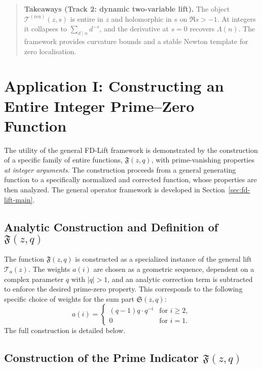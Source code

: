 \documentclass[11pt,a4paper]{amsart}
\theoremstyle{plain}
\theoremstyle{definition}
\theoremstyle{remark}
\begin{document}
\begin{quote}\small
\textbf{Takeaways (Track 2: dynamic two-variable lift).}
The object $\mathcal T^{(\mathrm{ren})}(z,s)$ is entire in $z$ and holomorphic in $s$ on $\Re s>-1$.
At integers it collapses to $\sum_{d\mid n}d^{-s}$, and the derivative at $s=0$ recovers $\Lambda(n)$.
The framework provides curvature bounds and a stable Newton template for zero localisation.
\end{quote}

\section{Application I: Constructing an Entire Integer Prime--Zero Function}
\label{sec:application-prime-indicator}

The utility of the general FD-Lift framework is demonstrated by the construction of a specific family of entire functions, $\mathfrak{F}(z,q)$, with prime-vanishing properties \emph{at integer arguments}. The construction proceeds from a general generating function to a specifically normalized and corrected function, whose properties are then analyzed.
The general operator framework is developed in Section~\ref{sec:fd-lift-main}.

\subsection{Analytic Construction and Definition of $\mathfrak{F}(z,q)$}

The function $\mathfrak{F}(z,q)$ is constructed as a specialized instance of the general lift $\mathcal{T}_a(z)$. The weights $a(i)$ are chosen as a geometric sequence, dependent on a complex parameter $q$ with $|q|>1$, and an analytic correction term is subtracted to enforce the desired prime-zero property. This corresponds to the following specific choice of weights for the sum part $\mathfrak{S}(z,q)$:
\[
a(i) = 
\begin{cases} 
(q-1)q \cdot q^{-i} & \text{for } i \ge 2, \\
0 & \text{for } i=1.
\end{cases}
\]
The full construction is detailed below.

\subsection{Construction of the Prime Indicator $\mathfrak{F}(z,q)$}
\label{sec:prime-indicator-construction}
\end{document}

